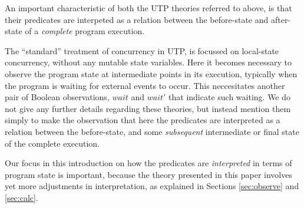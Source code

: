 An important characteristic of both the UTP theories referred to above,
is that their predicates are interpeted as a relation between the before-state
and after-state of a \emph{complete} program execution.

The ``standard'' treatment of concurrency in UTP\cite[Chps. 7,8]{Hoare-He98},
is focussed on local-state concurrency, without any mutable state variables.
Here it becomes necessary to observe the program state at intermediate points
in its execution,
typically when the program is waiting
for external events to occur.
This neccesitates another pair of Boolean observations, $wait$ and $wait'$
that indicate such waiting.
We do not give any further details regarding these theories,
but instead mention them simply to make the observation
that here the predicates are interpreted as a relation between
the before-state,
and some \emph{subsequent} intermediate or final state of the complete execution.

Our focus in this introduction on how the predicates are \emph{interpreted}
in terms of program state is important,
because the theory presented in this paper involves yet more
adjustments in interpretation,
as explained in Sections \ref{sec:observe} and \ref{sec:calc}.
